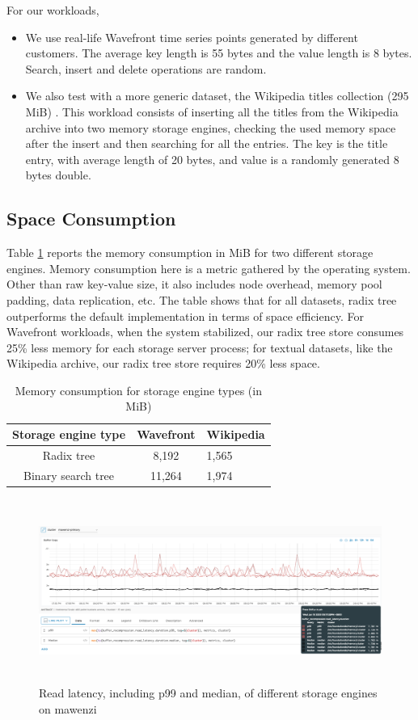 \documentclass[sigplan,screen,nonacm]{acmart}
\begin{document}
For our workloads, 
\begin{itemize}
    \item We use real-life Wavefront time series points generated by different customers. The average key length is 55 bytes and the value length is 8 bytes. Search, insert and delete operations are random. 
    \item We also test with a more generic dataset, the Wikipedia titles collection (295 MiB) \cite{wikidatasets}. This workload consists of inserting all the titles from the Wikipedia archive into two memory storage engines, checking the used memory space after the insert and then searching for all the entries. The key is the title entry, with average length of 20 bytes, and value is a randomly generated 8 bytes double. 
\end{itemize}

\subsection{Space Consumption}
Table \ref{tab:memory-usage} reports the memory consumption in MiB for two different storage engines. Memory consumption here is a metric gathered by the operating system.  Other than raw key-value size, it also includes node overhead, memory pool padding, data replication, etc. The table shows that for all datasets, radix tree outperforms the default implementation in terms of space efficiency. For Wavefront workloads, when the system stabilized, our radix tree store consumes 25\% less memory for each storage server process; for textual datasets, like the Wikipedia archive, our radix tree store requires 20\% less space. 

\begin{table}[h]
  \caption{Memory consumption for storage engine types (in MiB)}
  \begin{tabular}{ccl}
    \toprule
    Storage engine type&Wavefront&Wikipedia\\
    \midrule
    Radix tree & 8,192 & 1,565\\
    Binary search tree & 11,264 & 1,974\\
    \bottomrule
  \end{tabular}
  \label{tab:memory-usage}
\end{table}

\begin{figure}[t]
  \centering
  \includegraphics[width=\linewidth, height=6cm]{pic/read latency.png}
  \setlength{\belowcaptionskip}{-8pt} 
  \caption{Read latency, including p99 and median, of different storage engines on mawenzi}
  \label{fig:read-latency}
\end{figure}
\end{document}
